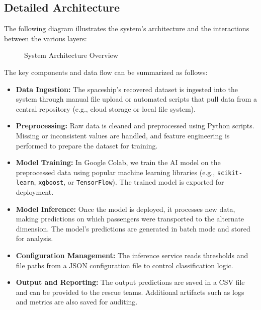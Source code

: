 \documentclass[15pt]{article}
\begin{document}
\subsection{Detailed Architecture}

The following diagram illustrates the system's architecture and the interactions between the various layers:

\begin{figure}[h!]
    \centering
    \caption{System Architecture Overview}
    \label{fig:architecture}
\end{figure}

The key components and data flow can be summarized as follows:

\begin{itemize}
    \item \textbf{Data Ingestion:} The spaceship’s recovered dataset is ingested into the system through manual file upload or automated scripts that pull data from a central repository (e.g., cloud storage or local file system).
    \item \textbf{Preprocessing:} Raw data is cleaned and preprocessed using Python scripts. Missing or inconsistent values are handled, and feature engineering is performed to prepare the dataset for training.
    \item \textbf{Model Training:} In Google Colab, we train the AI model on the preprocessed data using popular machine learning libraries (e.g., \texttt{scikit-learn}, \texttt{xgboost}, or \texttt{TensorFlow}). The trained model is exported for deployment.
    \item \textbf{Model Inference:} Once the model is deployed, it processes new data, making predictions on which passengers were transported to the alternate dimension. The model’s predictions are generated in batch mode and stored for analysis.
    \item \textbf{Configuration Management:} The inference service reads thresholds and file paths from a JSON configuration file to control classification logic.
    \item \textbf{Output and Reporting:} The output predictions are saved in a CSV file and can be provided to the rescue teams. Additional artifacts such as logs and metrics are also saved for auditing.
\end{itemize}
\end{document}
